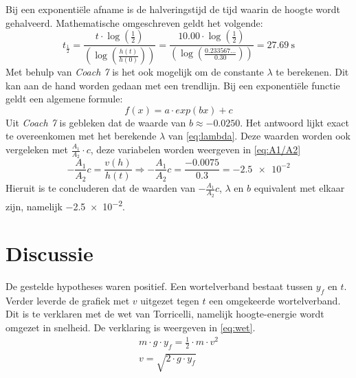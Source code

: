 \documentclass[numbers=endperiod]{scrartcl}
\begin{document}
Bij een exponentiële afname is de halveringstijd de tijd waarin de hoogte wordt gehalveerd. Mathematische omgeschreven geldt het volgende:
\begin{equation}\label{eq:half}
t_{\frac{1}{2}} = \frac{t \cdot \log(\frac{1}{2})}{\left(\log \left(\frac{h(t)}{h(0)}\right)\right)} = \frac{10.00 \cdot \log(\frac{1}{2})}{\left(\log \left(\frac{0.233567...}{0.30}\right)\right)} = \SI{27.69}{\second}
\end{equation}
Met behulp van \textit{Coach 7} is het ook mogelijk om de constante $\lambda$ te berekenen. Dit kan aan de hand worden gedaan met een trendlijn. Bij een exponentiële functie geldt een algemene formule:
\begin{equation}
    f(x) = a \cdot exp(bx) + c
\end{equation}
Uit \textit{Coach 7} is gebleken dat de waarde van $b \approx-0.0250$. Het antwoord lijkt exact te overeenkomen met het berekende $\lambda$ van \cref{eq:lambda}. Deze waarden worden ook vergeleken met $\frac{A_1}{A_2}\cdot c$, deze variabelen worden weergeven in \cref{eq:A1/A2}
\begin{equation}\label{eq:A1/A2}
 -\frac{A_1}{A_2}c = \frac{v(h)}{h(t)} \Rightarrow -\frac{A_1}{A_2}c = \frac{-0.0075}{0.3} = \num{-2.5e-2}
\end{equation}
Hieruit is te concluderen dat de waarden van $-\frac{A_1}{A_2}c$, $\lambda$ en $b$ equivalent met elkaar zijn, namelijk \num{-2.5e-2}. 




















\section{Discussie}
De gestelde hypotheses waren positief. Een wortelverband bestaat tussen $y_f$ en $t$. Verder leverde de grafiek met $v$ uitgezet tegen $t$ een omgekeerde wortelverband. Dit is te verklaren met de wet van Torricelli, namelijk hoogte-energie wordt omgezet in snelheid. De verklaring is weergeven in \cref{eq:wet}.
\begin{equation}\label{eq:wet}
\begin{split}
m \cdot g \cdot y_f = \frac{1}{2} \cdot m \cdot v^2\\
v = \sqrt{2 \cdot g \cdot y_f}
\end{split}
\end{equation}
\end{document}

